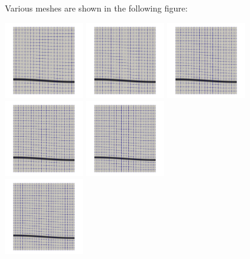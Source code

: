 Various meshes are shown in the following figure:

\begin{center}
\includegraphics[width=3.42cm]{python_codes/fieldstone_25/images/mesh.0000.jpg}
\includegraphics[width=3.42cm]{python_codes/fieldstone_25/images/mesh.0001.jpg}
\includegraphics[width=3.42cm]{python_codes/fieldstone_25/images/mesh.0002.jpg}
\includegraphics[width=3.42cm]{python_codes/fieldstone_25/images/mesh.0003.jpg}
\includegraphics[width=3.42cm]{python_codes/fieldstone_25/images/mesh.0004.jpg}\\
\includegraphics[width=3.42cm]{python_codes/fieldstone_25/images/mesh.0005.jpg}

\end{center}
